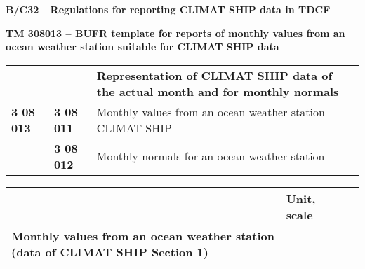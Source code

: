 \textbf{B/C32} -- \textbf{Regulations for reporting CLIMAT SHIP data in TDCF}

\textbf{TM 308013 -- BUFR template for reports of monthly values from an ocean weather station suitable for CLIMAT SHIP data}

\begin{longtable}[]{@{}lll@{}}
\toprule
\endhead
& & \textbf{Representation of CLIMAT SHIP data of the actual month and for monthly normals}\tabularnewline
\textbf{3 08 013} & \textbf{3 08 011} & Monthly values from an ocean weather station -- CLIMAT SHIP\tabularnewline
& \textbf{3 08 012} & Monthly normals for an ocean weather station\tabularnewline
\bottomrule
\end{longtable}

\begin{longtable}[]{@{}llll@{}}
\toprule
& Unit, scale & &\tabularnewline
\midrule
\endhead
\begin{minipage}[t]{0.22\columnwidth}\raggedright
\textbf{Monthly values from an ocean weather station (data of CLIMAT SHIP Section 1)}


\end{minipage}
\end{longtable}
